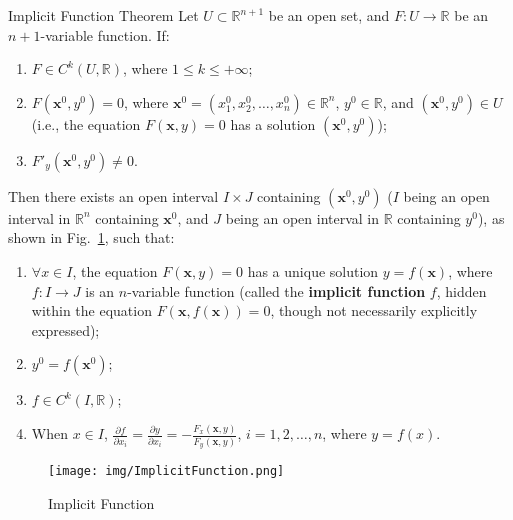 \documentclass[11pt]{../../TexTemplate/elegantbook}
\begin{document}
\begin{theorem}{Implicit Function Theorem}
    Let \(U \subset \mathbb{R}^{n+1}\) be an open set, and \(F: U \to \mathbb{R}\) be an \(n+1\)-variable function. If:  
    \begin{enumerate}
        \item \(F \in C^k(U, \mathbb{R})\), where \(1 \leq k \leq +\infty\);
        \item \(F(\mathbf{x}^0, y^0) = 0\), 
            where \(\mathbf{x}^0 = (x_1^0, x_2^0, \dots, x_n^0) \in \mathbb{R}^n\), \(y^0 \in \mathbb{R}\), 
            and \((\mathbf{x}^0, y^0) \in U\) 
            (i.e., the equation \(F(\mathbf{x}, y) = 0\) has a solution \((\mathbf{x}^0, y^0)\));
        \item \(F'_y(\mathbf{x}^0, y^0) \neq 0\).
    \end{enumerate}

    Then there exists an open interval \(I \times J\) containing \((\mathbf{x}^0, y^0)\) 
    (\(I\) being an open interval in \(\mathbb{R}^n\) containing \(\mathbf{x}^0\), 
    and \(J\) being an open interval in \(\mathbb{R}\) containing \(y^0\)), 
    as shown in Fig.~\ref{fig:ImplicitFunction}, such that:  
    \begin{enumerate}
        \item \(\forall x \in I\), the equation \(F(\mathbf{x}, y) = 0\) has a unique solution \(y = f(\mathbf{x})\), 
            where \(f: I \to J\) is an \(n\)-variable function 
            (called the \textbf{implicit function} \(f\), hidden within the equation \(F(\mathbf{x}, f(\mathbf{x})) = 0\), 
            though not necessarily explicitly expressed);
        \item \(y^0 = f(\mathbf{x}^0)\);
        \item \(f \in C^k(I, \mathbb{R})\);
        \item When \(x \in I\), 
            \(\frac{\partial f}{\partial x_i} = \frac{\partial y}{\partial x_i} = -\frac{F_x(\mathbf{x}, y)}{F_y(\mathbf{x}, y)}\), 
            \(i = 1, 2, \dots, n\), where \(y = f(x)\).
    \end{enumerate}
\end{theorem}  
\begin{figure}[h]
    \centering
    \texttt{[image: img/ImplicitFunction.png]}
    \caption{Implicit Function}
    \label{fig:ImplicitFunction}
\end{figure}
\end{document}
